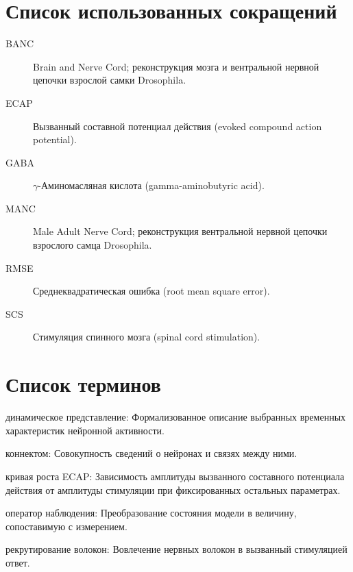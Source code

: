 \chapter*{Список использованных сокращений}
\begin{description}
\item[BANC] Brain and Nerve Cord; реконструкция мозга и вентральной нервной цепочки взрослой самки Drosophila.
\item[ECAP] Вызванный составной потенциал действия (evoked compound action potential).
\item[GABA] $\gamma$-Аминомасляная кислота (gamma-aminobutyric acid).
\item[MANC] Male Adult Nerve Cord; реконструкция вентральной нервной цепочки взрослого самца Drosophila.
\item[RMSE] Среднеквадратическая ошибка (root mean square error).
\item[SCS] Стимуляция спинного мозга (spinal cord stimulation).
\end{description}

\chapter*{Список терминов}
\noindent динамическое представление: Формализованное описание выбранных временных характеристик нейронной активности.\par
\noindent коннектом: Совокупность сведений о нейронах и связях между ними.\par
\noindent кривая роста ECAP: Зависимость амплитуды вызванного составного потенциала действия от амплитуды стимуляции при фиксированных остальных параметрах.\par
\noindent оператор наблюдения: Преобразование состояния модели в величину, сопоставимую с измерением.\par
\noindent рекрутирование волокон: Вовлечение нервных волокон в вызванный стимуляцией ответ.\par
